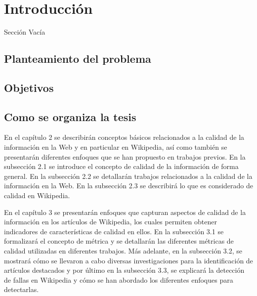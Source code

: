 \chapter{Introducci\'on}
\label{chap:intro}

Secci\'on Vac\'ia

\section{Planteamiento del problema}

\section{Objetivos}

\section{Como se organiza la tesis}
En el cap\'itulo 2 se describir\'an conceptos b\'asicos relacionados a la calidad de la informaci\'on en la Web y en particular en Wikipedia, as\'i como tambi\'en se presentar\'an diferentes enfoques que se han propuesto en trabajos previos. En la subsecci\'on 2.1 se introduce el concepto de calidad de la informaci\'on de forma general. En la subsecci\'on 2.2 se detallar\'an trabajos relacionados a la calidad de la informaci\'on en la Web. En la subsecci\'on 2.3 se describir\'a lo que es considerado de calidad en Wikipedia.

En el cap\'itulo 3 se presentar\'an enfoques que capturan aspectos de calidad de la informaci\'on en los art\'iculos de Wikipedia, los cuales permiten obtener indicadores de caracter\'isticas de calidad en ellos. En la subsecci\'on 3.1 se formalizar\'a el concepto de m\'etrica y se detallar\'an las diferentes m\'etricas de calidad utilizadas en diferentes trabajos.
M\'as adelante, en la subsecci\'on 3.2, se mostrar\'a c\'omo se llevaron a cabo diversas investigaciones para la identificaci\'on de art\'iculos destacados y por \'ultimo en la subsecci\'on 3.3, se explicar\'a la detecci\'on de fallas en Wikipedia y c\'omo se han abordado los diferentes enfoques para detectarlas. 
